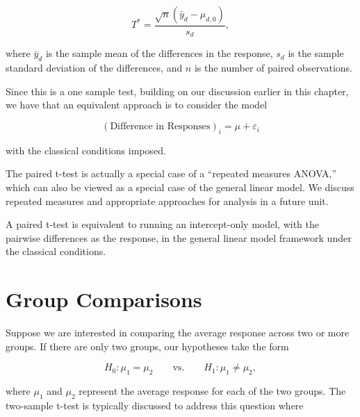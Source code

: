 \documentclass[
  letterpaper,
  DIV=11,
  numbers=noendperiod]{scrreprt}
\theoremstyle{definition}
\theoremstyle{definition}
\theoremstyle{remark}
\begin{document}
\[T^* = \frac{\sqrt{n}\left(\bar{y}_d - \mu_{d,0}\right)}{s_d},\]

where \(\bar{y}_d\) is the sample mean of the differences in the
response, \(s_d\) is the sample standard deviation of the differences,
and \(n\) is the number of paired observations.

Since this is a one sample test, building on our discussion earlier in
this chapter, we have that an equivalent approach is to consider the
model

\[(\text{Difference in Responses})_i = \mu + \varepsilon_i\]

with the classical conditions imposed.

The paired t-test is actually a special case of a ``repeated measures
ANOVA,'' which can also be viewed as a special case of the general
linear model. We discuss repeated measures and appropriate approaches
for analysis in a future unit.

\begin{tcolorbox}[enhanced jigsaw, bottomrule=.15mm, titlerule=0mm, bottomtitle=1mm, colback=white, coltitle=black, rightrule=.15mm, leftrule=.75mm, toprule=.15mm, toptitle=1mm, left=2mm, opacityback=0, colframe=quarto-callout-tip-color-frame, breakable, title=\textcolor{quarto-callout-tip-color}{\faLightbulb}\hspace{0.5em}{Big Idea}, arc=.35mm, colbacktitle=quarto-callout-tip-color!10!white, opacitybacktitle=0.6]

A paired t-test is equivalent to running an intercept-only model, with
the pairwise differences as the response, in the general linear model
framework under the classical conditions.

\end{tcolorbox}

\hypertarget{group-comparisons}{%
\section{Group Comparisons}\label{group-comparisons}}

Suppose we are interested in comparing the average response across two
or more groups. If there are only two groups, our hypotheses take the
form

\[H_0: \mu_1 = \mu_2 \qquad \text{vs.} \qquad H_1: \mu_1 \neq \mu_2,\]

where \(\mu_1\) and \(\mu_2\) represent the average response for each of
the two groups. The two-sample t-test is typically discussed to address
this question where
\end{document}
